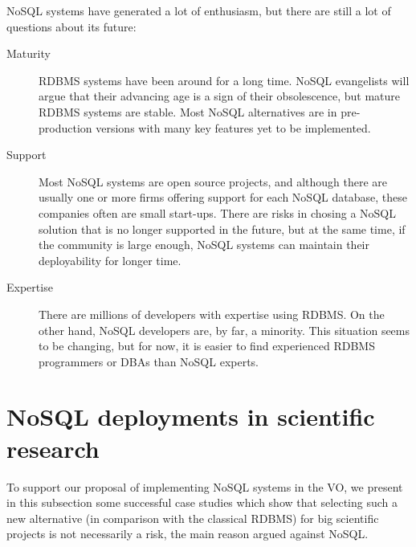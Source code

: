 NoSQL systems have generated a lot of enthusiasm, but there are still a lot of questions about its future:

\begin{description} %

\item[Maturity] %

RDBMS systems have been around for a long time. NoSQL evangelists will argue that their advancing age is a sign of their obsolescence, but mature RDBMS systems are stable. Most NoSQL alternatives are in pre-production versions with many key features yet to be implemented.

\item[Support] %

Most NoSQL systems are open source projects, and although there are usually one or more firms offering support for each NoSQL database, these companies often are small start-ups.
There are risks in chosing a NoSQL solution that is no longer supported in the future, but at the same time, if the community is large enough, NoSQL systems can maintain their deployability for longer time.

\item[Expertise] %

There are millions of developers with expertise using RDBMS. On
the %
other hand, NoSQL developers are, by far, a minority. This situation seems to
be changing, %
but for now, it is easier to find experienced RDBMS programmers or
DBAs %
than NoSQL experts.

\end{description} %


\section{NoSQL deployments in scientific research} %
\label{sec:nosql_deployments_in_scientific_research}

To support our proposal of implementing
NoSQL systems in the VO, %
we present in this
subsection
some successful case studies which show that selecting such a new alternative (in comparison with the classical RDBMS) 
for big scientific projects is
not necessarily %
a risk, the main reason argued
against NoSQL. %

